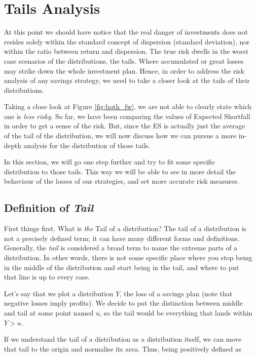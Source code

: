 \section{Tails Analysis}

At this point we should have notice that the real danger of investments does not resides solely within the standard concept of dispersion (standard deviation), nor within the ratio between return and dispersion. The true risk dwells in the worst case scenarios of the distributions, the tails. Where accumulated or great losses may strike down the whole investment plan. Hence, in order to address the risk analysis of any savings strategy, we need to take a closer look at the tails of their distributions.


Taking a close look at Figure \ref{fig:both_fw}, we are not able to clearly state which one is \textit{less risky}. So far, we have been comparing the values of Expected Shortfall in order to get a sense of the risk. But, since the ES is actually just the average of the tail of the distribution, we will now discuss how we can pursue a more in-depth analysis for the distribution of those tails.

In this section, we will go one step further and try to fit some specific distribution to those tails. This way we will be able to see in more detail the behaviour of the losses of our strategies, and set more accurate risk measures.

\subsection{Definition of \textit{Tail}}

First things first. What is \emph{the} Tail of a distribution? The tail of a distribution is not a precisely defined term; it can have many different forms and definitions. Generally, the \textit{tail} is considered a broad term to name the extreme parts of a distribution. In other words, there is not some specific place where you stop being in the middle of the distribution and start being in the tail, and where to put that line is up to every case.

Let's say that we plot a distribution $Y$, the loss of a savings plan (note that negative losses imply profits). We decide to put the distinction between middle and tail at some point named $u$, so the tail would be everything that lands within $Y>u$.

If we understand the tail of a distribution as a distribution itself, we can move that tail to the origin and normalise its area. Thus, being positively defined as

